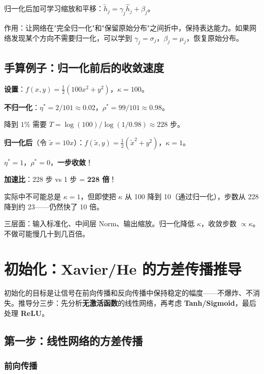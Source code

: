 \documentclass[12pt, a4paper]{ctexart}
\begin{document}
归一化后加可学习缩放和平移：$\tilde{h}_j = \gamma_j \hat{h}_j + \beta_j$。

作用：让网络在"完全归一化"和"保留原始分布"之间折中，保持表达能力。如果网络发现某个方向不需要归一化，可以学到 $\gamma_j = \sigma_j$，$\beta_j = \mu_j$，恢复原始分布。

\subsection{手算例子：归一化前后的收敛速度}

\textbf{设置}：$f(x,y) = \frac{1}{2}(100x^2 + y^2)$，$\kappa = 100$。

\textbf{不归一化}：$\eta^* = 2/101 \approx 0.02$，$\rho^* = 99/101 \approx 0.98$。

降到 $1\%$ 需要 $T = \log(100)/\log(1/0.98) \approx 228$ 步。

\textbf{归一化后}（令 $\tilde{x} = 10x$）：$f(\tilde{x},y) = \frac{1}{2}(\tilde{x}^2 + y^2)$，$\kappa = 1$。

$\eta^* = 1$，$\rho^* = 0$，\textbf{一步收敛}！

\textbf{加速比}：228 步 vs 1 步 = \textbf{228 倍}！

实际中不可能总是 $\kappa = 1$，但即使把 $\kappa$ 从 100 降到 10（通过归一化），步数从 228 降到约 23——仍然快了 10 倍。

\begin{keypoint}[数据归一化对训练至关重要]
三层面：输入标准化、中间层 Norm、输出缩放。归一化降低 $\kappa$，收敛步数 $\propto \kappa$。不做可能慢几十到几百倍。
\end{keypoint}


\section{初始化：Xavier/He 的方差传播推导}

初始化的目标是让信号在前向传播和反向传播中保持稳定的幅度——不爆炸、不消失。推导分三步：先分析\textbf{无激活函数}的线性网络，再考虑 \textbf{Tanh/Sigmoid}，最后处理 \textbf{ReLU}。

\subsection{第一步：线性网络的方差传播}

\subsubsection{前向传播}
\end{document}

